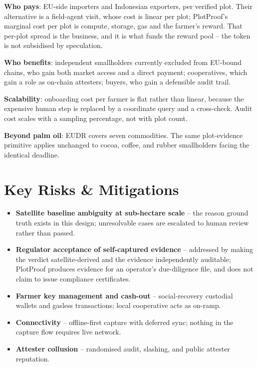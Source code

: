 \documentclass[11pt]{article}
\begin{document}
\textbf{Who pays}: EU-side importers and Indonesian exporters, per verified plot. Their alternative is a field-agent visit, whose cost is linear per plot; PlotProof's marginal cost per plot is compute, storage, gas and the farmer's reward. That per-plot spread is the business, and it is what funds the reward pool -- the token is not subsidised by speculation.

\textbf{Who benefits}: independent smallholders currently excluded from EU-bound chains, who gain both market access and a direct payment; cooperatives, which gain a role as on-chain attesters; buyers, who gain a defensible audit trail.

\textbf{Scalability}: onboarding cost per farmer is flat rather than linear, because the expensive human step is replaced by a coordinate query and a cross-check. Audit cost scales with a sampling percentage, not with plot count.

\textbf{Beyond palm oil}: EUDR covers seven commodities. The same plot-evidence primitive applies unchanged to cocoa, coffee, and rubber smallholders facing the identical deadline.

\section{Key Risks \& Mitigations}
\begin{itemize}[leftmargin=1.4em]
  \item \textbf{Satellite baseline ambiguity at sub-hectare scale} -- the reason ground truth exists in this design; unresolvable cases are escalated to human review rather than passed.
  \item \textbf{Regulator acceptance of self-captured evidence} -- addressed by making the verdict satellite-derived and the evidence independently auditable; PlotProof produces evidence for an operator's due-diligence file, and does not claim to issue compliance certificates.
  \item \textbf{Farmer key management and cash-out} -- social-recovery custodial wallets and gasless transactions; local cooperative acts as on-ramp.
  \item \textbf{Connectivity} -- offline-first capture with deferred sync; nothing in the capture flow requires live network.
  \item \textbf{Attester collusion} -- randomised audit, slashing, and public attester reputation.
\end{itemize}
\end{document}
